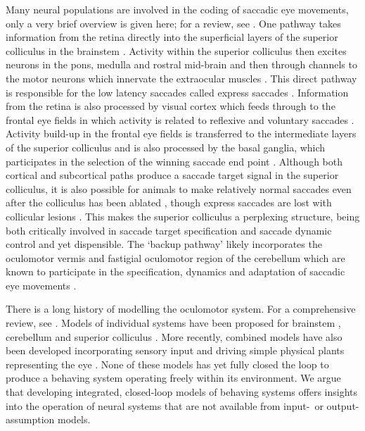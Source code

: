 \documentclass{frontiersSCNS}
\begin{document}
Many neural populations are involved in the coding of saccadic eye
movements, only a very brief overview is given here; for a
review, see \cite{munoz_commentary:_2002}. One pathway takes
information from the retina directly into the superficial layers of
the superior colliculus in the brainstem
\citep{sterling_receptive_1971,linden_massive_1983,wu_involvement_1994}.
Activity within
the superior colliculus then excites neurons in the pons, medulla and
rostral mid-brain \citep{sparks_brainstem_2002} and then through
channels to the motor neurons which innervate the extraocular muscles
\citep{fuchs_firing_1970,sparks_brainstem_2002}. This direct pathway
is responsible for the low latency saccades called express saccades
\citep{schiller_effect_1987,edelman_activity_1996}.
%
Information from the retina is also processed by visual cortex which
feeds through to the frontal eye fields in which activity is related
to reflexive and voluntary
saccades \citep{schall_neural_1999}. Activity build-up in the frontal
eye fields is transferred to the intermediate layers of the superior
colliculus
\citep{stanton_frontal_1988-1} and is also processed by the basal ganglia,
which participates in the selection of the winning saccade end point
\citep{stanton_frontal_1988}.
%
Although both cortical and subcortical paths produce a saccade
target signal in the superior colliculus, it is also possible for
animals to make relatively normal saccades even after the
colliculus has been ablated
\citep{wurtz_activity_1972,aizawa_reversible_1998},
though express saccades are lost with collicular lesions
\citep{schiller_effect_1987}. This makes the superior colliculus
a perplexing structure, being both critically involved in saccade
target specification \citep{sparks_sensory_1987} and saccade dynamic control
\citep{waitzman_superior_1991,goossens_optimal_2012} and yet dispensible.
The `backup pathway' likely incorporates the oculomotor vermis and
fastigial oculomotor region of the
cerebellum which are known to participate in the specification, dynamics
and adaptation of saccadic eye movements
\citep{kleine_saccade-related_2003,takagi_effects_1998}.

There is a long history of modelling the oculomotor system. For a comprehensive
review, see \cite{girard_brainstem_2005}. Models of individual systems have been proposed for brainstem \citep{robinson_oculomotor_1975,scudder_new_1988,gancarz_neural_1998},
cerebellum \citep{quaia_model_1999,dean_modelling_1995,dean_learning_1994} and
superior colliculus
\citep{arai_two-dimensional_1994,moren_mechanism_2013,marino_spatial_2012}.
More recently, combined models have also been
developed incorporating sensory input \citep{cope_basal_2017} and driving simple
physical plants representing the eye \citep{tabareau_geometry_2007,nguyen_saccade_2014,thurat_biomimetic_2015}.
None of these models has yet fully closed the loop to produce a behaving system
operating freely within its environment. We argue that developing
integrated, closed-loop models of behaving systems offers insights into
the operation of neural systems that are not available from
input-~or output-assumption models.
\end{document}
